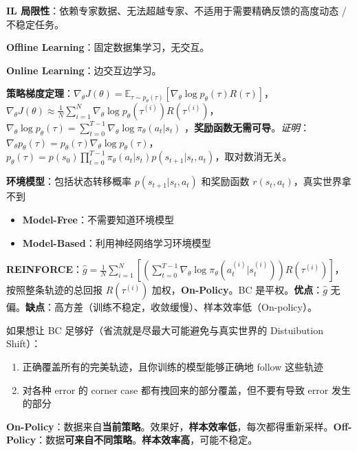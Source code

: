 \documentclass[
  8pt]{extarticle}
\providecommand{\tightlist}{%
  \setlength{\itemsep}{0pt}\setlength{\parskip}{0pt}}
\begin{document}
\begin{multicols*}{4}
\textbf{IL
局限性}：依赖专家数据、无法超越专家、不适用于需要精确反馈的高度动态 /
不稳定任务。

\textbf{Offline Learning}：固定数据集学习，无交互。

\textbf{Online Learning}：边交互边学习。

\textbf{策略梯度定理}：\(\nabla_\theta J(\theta) = \mathbb{E}_{\tau \sim p_\theta(\tau)} [\nabla_\theta \log p_\theta(\tau) R(\tau)]\)，\(\nabla_\theta J(\theta) \approx \frac{1}{N} \sum_{i=1}^{N} \nabla_\theta \log p_\theta(\tau^{(i)}) R(\tau^{(i)})\)，\(\nabla_\theta \log p_\theta(\tau) = \sum_{t=0}^{T-1} \nabla_\theta \log \pi_\theta(a_t | s_t)\)
，\textbf{奖励函数无需可导}。\emph{证明}：\(\nabla_\theta p_\theta(\tau) = p_\theta(\tau) \nabla_\theta \log p_\theta(\tau)\)，\(p_\theta(\tau) = p(s_0) \prod_{t=0}^{T-1} \pi_\theta(a_t | s_t) p(s_{t+1} | s_t, a_t)\)，取对数消无关。

\textbf{环境模型}：包括状态转移概率 \(p(s_{t+1} | s_t, a_t)\) 和奖励函数
\(r(s_t, a_t)\)，真实世界拿不到

\begin{itemize}
\tightlist
\item
  \textbf{Model-Free}：不需要知道环境模型
\item
  \textbf{Model-Based}：利用神经网络学习环境模型
\end{itemize}

\textbf{REINFORCE}：\(\hat{g} = \frac{1}{N} \sum_{i=1}^{N} \left[ \left( \sum_{t=0}^{T-1} \nabla_\theta \log \pi_\theta(a_t^{(i)} | s_t^{(i)}) \right) R(\tau^{(i)}) \right]\)，按照整条轨迹的总回报
\(R(\tau^{(i)})\) 加权，\textbf{On-Policy}。BC
是平权。\textbf{优点}：\(\hat{g}\)
无偏。\textbf{缺点}：高方差（训练不稳定，收敛缓慢）、样本效率低（On-policy）。

如果想让 BC 足够好（省流就是尽最大可能避免与真实世界的 Distuibution
Shift）：

\begin{enumerate}
\def\labelenumi{\arabic{enumi}.}
\tightlist
\item
  正确覆盖所有的完美轨迹，且你训练的模型能够正确地 follow 这些轨迹
\item
  对各种 error 的 corner case 都有拽回来的部分覆盖，但不要有导致 error
  发生的部分
\end{enumerate}

\textbf{On-Policy}：数据来自\textbf{当前策略}。效果好，\textbf{样本效率低}，每次都得重新采样。\textbf{Off-Policy}：数据\textbf{可来自不同策略}。\textbf{样本效率高}，可能不稳定。


\end{multicols*}
\end{document}
